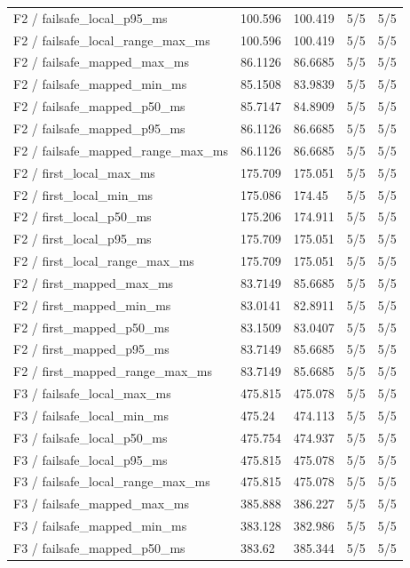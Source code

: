 \begin{tabular}{@{}lllll@{}}
F2 / failsafe\_local\_p95\_ms & 100.596 & 100.419 & 5/5 & 5/5 \\
F2 / failsafe\_local\_range\_max\_ms & 100.596 & 100.419 & 5/5 & 5/5 \\
F2 / failsafe\_mapped\_max\_ms & 86.1126 & 86.6685 & 5/5 & 5/5 \\
F2 / failsafe\_mapped\_min\_ms & 85.1508 & 83.9839 & 5/5 & 5/5 \\
F2 / failsafe\_mapped\_p50\_ms & 85.7147 & 84.8909 & 5/5 & 5/5 \\
F2 / failsafe\_mapped\_p95\_ms & 86.1126 & 86.6685 & 5/5 & 5/5 \\
F2 / failsafe\_mapped\_range\_max\_ms & 86.1126 & 86.6685 & 5/5 & 5/5 \\
F2 / first\_local\_max\_ms & 175.709 & 175.051 & 5/5 & 5/5 \\
F2 / first\_local\_min\_ms & 175.086 & 174.45 & 5/5 & 5/5 \\
F2 / first\_local\_p50\_ms & 175.206 & 174.911 & 5/5 & 5/5 \\
F2 / first\_local\_p95\_ms & 175.709 & 175.051 & 5/5 & 5/5 \\
F2 / first\_local\_range\_max\_ms & 175.709 & 175.051 & 5/5 & 5/5 \\
F2 / first\_mapped\_max\_ms & 83.7149 & 85.6685 & 5/5 & 5/5 \\
F2 / first\_mapped\_min\_ms & 83.0141 & 82.8911 & 5/5 & 5/5 \\
F2 / first\_mapped\_p50\_ms & 83.1509 & 83.0407 & 5/5 & 5/5 \\
F2 / first\_mapped\_p95\_ms & 83.7149 & 85.6685 & 5/5 & 5/5 \\
F2 / first\_mapped\_range\_max\_ms & 83.7149 & 85.6685 & 5/5 & 5/5 \\
F3 / failsafe\_local\_max\_ms & 475.815 & 475.078 & 5/5 & 5/5 \\
F3 / failsafe\_local\_min\_ms & 475.24 & 474.113 & 5/5 & 5/5 \\
F3 / failsafe\_local\_p50\_ms & 475.754 & 474.937 & 5/5 & 5/5 \\
F3 / failsafe\_local\_p95\_ms & 475.815 & 475.078 & 5/5 & 5/5 \\
F3 / failsafe\_local\_range\_max\_ms & 475.815 & 475.078 & 5/5 & 5/5 \\
F3 / failsafe\_mapped\_max\_ms & 385.888 & 386.227 & 5/5 & 5/5 \\
F3 / failsafe\_mapped\_min\_ms & 383.128 & 382.986 & 5/5 & 5/5 \\
F3 / failsafe\_mapped\_p50\_ms & 383.62 & 385.344 & 5/5 & 5/5 \\

\end{tabular}
